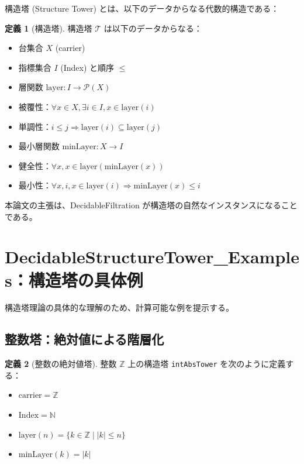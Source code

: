 \documentclass[a4paper,12pt]{ltjsarticle}
\theoremstyle{definition}
\newtheorem{definition}{定義}[section]
\begin{document}
構造塔 (Structure Tower) とは、以下のデータからなる代数的構造である：

\begin{definition}[構造塔]
構造塔 $\mathcal{T}$ は以下のデータからなる：
\begin{itemize}
\item 台集合 $X$ (carrier)
\item 指標集合 $I$ (Index) と順序 $\leq$
\item 層関数 $\text{layer} : I \to \mathcal{P}(X)$
\item 被覆性：$\forall x \in X, \exists i \in I, x \in \text{layer}(i)$
\item 単調性：$i \leq j \Rightarrow \text{layer}(i) \subseteq \text{layer}(j)$
\item 最小層関数 $\text{minLayer} : X \to I$
\item 健全性：$\forall x, x \in \text{layer}(\text{minLayer}(x))$
\item 最小性：$\forall x, i, x \in \text{layer}(i) \Rightarrow \text{minLayer}(x) \leq i$
\end{itemize}
\end{definition}

本論文の主張は、DecidableFiltration が構造塔の自然なインスタンスになることである。

\section{DecidableStructureTower\_Examples：構造塔の具体例}

構造塔理論の具体的な理解のため、計算可能な例を提示する。

\subsection{整数塔：絶対値による階層化}

\begin{definition}[整数の絶対値塔]
整数 $\mathbb{Z}$ 上の構造塔 \texttt{intAbsTower} を次のように定義する：
\begin{itemize}
\item $\text{carrier} = \mathbb{Z}$
\item $\text{Index} = \mathbb{N}$
\item $\text{layer}(n) = \{k \in \mathbb{Z} \mid |k| \leq n\}$
\item $\text{minLayer}(k) = |k|$
\end{itemize}
\end{definition}
\end{document}
